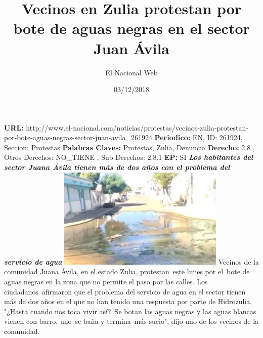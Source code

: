 \documentclass{article}%
\title{\textbf{Vecinos en Zulia protestan por bote de aguas negras en el sector Juan Ávila}}%
\author{El Nacional Web}%
\date{03/12/2018}%
\begin{document}
%
\normalsize%
\maketitle%
\textbf{URL: }%
http://www.el{-}nacional.com/noticias/protestas/vecinos{-}zulia{-}protestan{-}por{-}bote{-}aguas{-}negras{-}sector{-}juan{-}avila\_261924\newline%
%
\textbf{Periodico: }%
EN, %
ID: %
261924, %
Seccion: %
Protestas\newline%
%
\textbf{Palabras Claves: }%
Protestas, Zulia, Denuncia\newline%
%
\textbf{Derecho: }%
2.8%
, Otros Derechos: %
NO\_TIENE%
, Sub Derechos: %
2.8.1%
\newline%
%
\textbf{EP: }%
SI\newline%
\newline%
%
\textbf{\textit{Los habitantes del sector Juana Ávila tienen más de dos años con el problema del servicio de agua}}%
\newline%
\newline%
%
\includegraphics[width=300px]{50.jpg}%
\newline%
%
Vecinos de la comunidad Juana Ávila, en el estado Zulia, protestan~este lunes por el~bote de aguas negras en la zona que no permite el paso por las calles.%
\newline%
%
Los ciudadanos~afirmaron que el problema del servicio de agua en el sector tienen más de dos años en el que no han tenido una respuesta por parte de Hidrozulia.%
\newline%
%
"¿Hasta cuando nos toca vivir así?~Se botan las aguas negras y las aguas blancas vienen con barro, uno~se baña y termina~más sucio", dijo uno de los vecinos de la comunidad.%
\newline%
%
\end{document}
